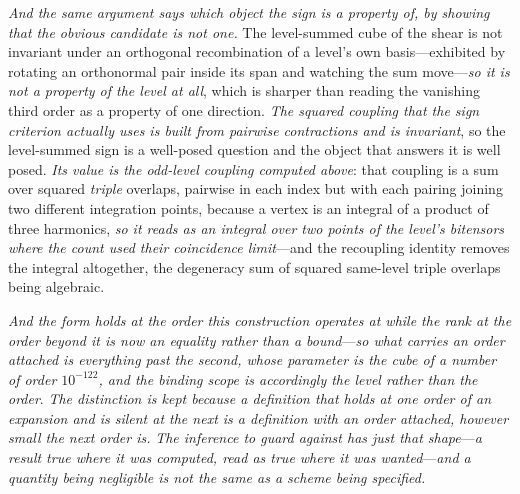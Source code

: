 \documentclass[11pt,a4paper]{article}
\theoremstyle{plain}
\theoremstyle{definition}
\theoremstyle{remark}
\begin{document}
\emph{And the same argument says which object the sign is a property of, by showing that the obvious candidate
is not one.} The level-summed cube of the shear is not invariant under an orthogonal recombination of a
level's own basis---exhibited by rotating an orthonormal pair inside its span and watching the sum
move---\emph{so it is not a property of the level at all}, which is sharper than reading the vanishing third
order as a property of one direction. \emph{The squared coupling that the sign criterion actually uses is
built from pairwise contractions and is invariant}, so the level-summed sign is a well-posed question and the
object that answers it is well posed. \emph{Its value is the odd-level coupling computed
above}: that coupling is a sum over squared \emph{triple} overlaps, pairwise in each index but with each
pairing joining two different integration points, because a vertex is an integral of a product of three
harmonics, \emph{so it reads as an integral over two points of the level's bitensors where the count used their
coincidence limit}---and the recoupling identity removes the integral altogether, the degeneracy sum of squared
same-level triple overlaps being algebraic.

\emph{And the form holds at the
order this construction operates at while the rank at the order beyond it is now an equality rather than a
bound}---\emph{so what carries an order attached is everything past the second, whose parameter is the cube of
a number of order $10^{-122}$, and the binding scope is accordingly the level rather than the order}.
\emph{The distinction is kept because a definition that holds at one order of an expansion and is silent at the
next is a definition with an order attached, however small the next order is.} \emph{The inference to guard against has
just that shape}---\emph{a result true where it was computed, read as true where it was wanted}---\emph{and a
quantity being negligible is not the same as a scheme being specified.}
\end{document}
